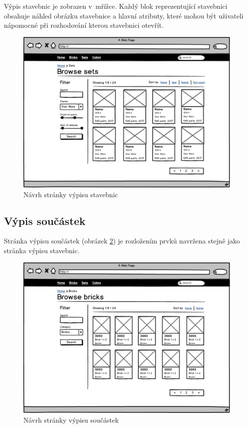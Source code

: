 Výpis stavebnic je zobrazen v~mřížce. Každý blok reprezentující stavebnici obsahuje náhled obrázku stavebnice a hlavní atributy, které mohou být uživateli nápomocné při rozhodování kterou stavebnici otevřít.

\begin{figure}[htbp]
    \centering
    \includegraphics[width=\textwidth,height=\textheight,keepaspectratio]{pdfs/wireframe_sets.pdf}
    \caption{Návrh stránky výpisu stavebnic}\label{wireframe-stavebnice-seznam}
\end{figure}

\subsection{Výpis součástek}
Stránka výpisu součástek (obrázek \ref{wireframe-soucaska-seznam}) je rozložením prvků navržena stejně jako stránka výpisu stavebnic. 

\begin{figure}[htbp]
    \centering
    \includegraphics[width=\textwidth,height=\textheight,keepaspectratio]{pdfs/wireframe_bricks.pdf}
    \caption{Návrh stránky výpisu součástek}\label{wireframe-soucaska-seznam}
\end{figure}

